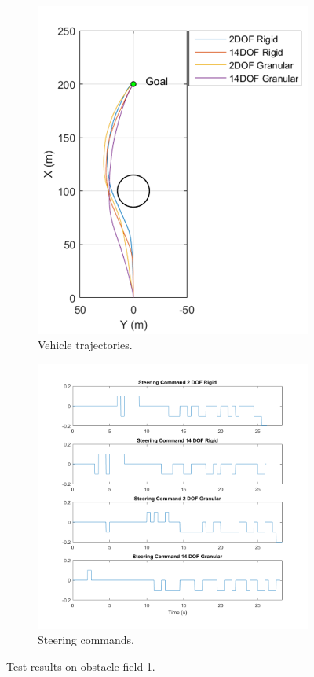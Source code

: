 \documentclass[12pt,onecolumn]{report}
\begin{document}
\begin{figure}
	\centering
	\begin{subfigure}[b]{0.49\columnwidth}
		\centering
		\includegraphics[height=\columnwidth]{Figs/ObstacleField1Trajectories.png}
		\caption{{\small Vehicle trajectories.}}   
		\label{fig:ObstacleField1Trajectories}
	\end{subfigure}
	\hfill
	\begin{subfigure}[b]{0.49\columnwidth}
		\centering
		\includegraphics[width=\columnwidth]{Figs/SteeringCommandsField1.png}
		\caption{\small Steering commands.}   
		\label{fig:SteeringCommandsField1}
	\end{subfigure}
	\caption{\small Test results on obstacle field 1.}
	\label{fig:Obst1TestData}
\end{figure}
\end{document}
